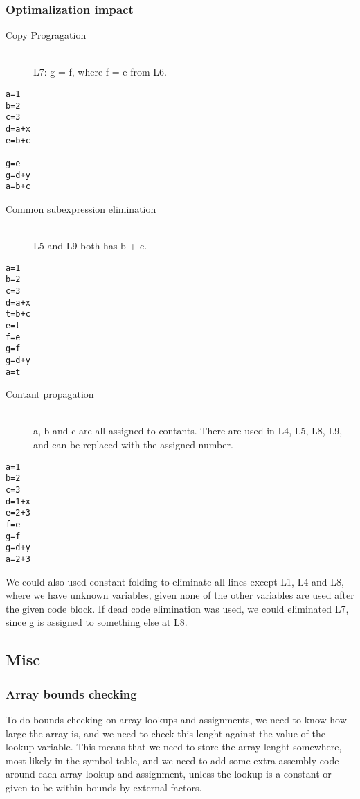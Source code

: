 \documentclass[english,a4paper]{scrartcl}
\begin{document}
\subsubsection{Optimalization impact}
\begin{description}
\item[Copy Progragation] \ \\
L7: g = f, where f = e from L6.
\end{description}
\begin{lstlisting}
a=1
b=2
c=3
d=a+x
e=b+c

g=e
g=d+y
a=b+c
\end{lstlisting}
\begin{description}
\item[Common subexpression elimination] \ \\
L5 and L9 both has b + c.
\end{description}
\begin{lstlisting}
a=1
b=2
c=3
d=a+x
t=b+c
e=t
f=e
g=f
g=d+y
a=t
\end{lstlisting}
\begin{description}
\item[Contant propagation] \ \\
a, b and c are all assigned to contants. There are used in L4, L5, L8, L9, and
can be replaced with the assigned number.    
\end{description}
\begin{lstlisting}
a=1
b=2
c=3
d=1+x
e=2+3
f=e
g=f
g=d+y
a=2+3
\end{lstlisting}
We could also used constant folding to eliminate all lines except L1, L4 and L8,
where we have unknown variables, given none of the other variables are used
after the given code block. If dead code elimination was used, we could
eliminated L7, since g is assigned to something else at L8.

\subsection{Misc}
\subsubsection{Array bounds checking}
To do bounds checking on array lookups and assignments, we need to know how
large the array is, and we need to check this lenght against the value of the
lookup-variable. This means that we need to store the array lenght somewhere,
most likely in the symbol table, and we need to add some extra assembly code
around each array lookup and assignment, unless the lookup is a constant or
given to be within bounds by external factors.
\end{document}
